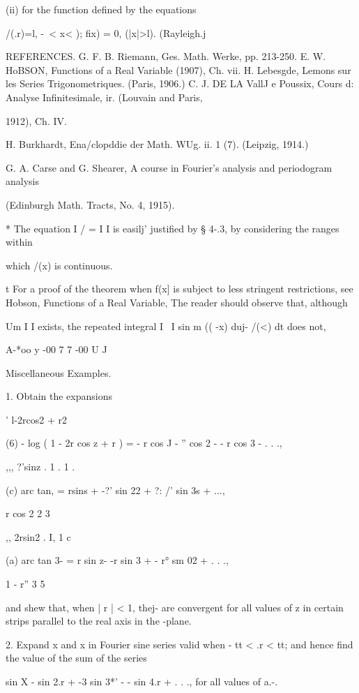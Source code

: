 {(ii) for the function defined by the equations

/(.r)=l, -\ < x< ); fix) = 0, (|x|>l). (Rayleigh.j

REFERENCES. G. F. B. Riemann, Ges. Math. Werke, pp. 213-250. E. W.
HoBSON, Functions of a Real Variable (1907), Ch. vii. H. Lebesgde,
Lemons sur les Series Trigonometriques. (Paris, 1906.) C. J. DE LA
VallJ e Poussix, Cours d: Analyse Infinitesimale, ir. (Louvain and
Paris,

1912), Ch. IV.

H. Burkhardt, Ena/clopddie der Math. WUg. ii. 1 (7). (Leipzig, 1914.)

G. A. Carse and G. Shearer, A course in Fourier's analysis and
periodogram analysis

(Edinburgh Math. Tracts, No. 4, 1915).

* The equation I / = I I is easilj' justified by § 4-.3, by
considering the ranges within

which /(x) is continuous.

t For a proof of the theorem when f(x] is subject to less stringent
restrictions, see Hobson, Functions of a Real Variable, %
The reader should observe that, although

Um I I exists, the repeated integral I \ I sin m (( -x) duj- /(<) dt
does not,

A-*oo y -00 7 7 -00 U J

%
%

Miscellaneous Examples.

1. Obtain the expansions

  ' l-2rcos2 + r2

(6) - log ( 1 - 2r cos z + r ) = - r cos J - '' cos 2 - - r cos 3 - .
. .,

,,, ?'sinz . 1 . 1 . \,

(c) arc tan, = rsins + -?' sin 22 + ?: /' sin 3s + ...,

   r cos 2 2 3

,, 2rsin2 . I,  1 c

(a) arc tan 3- = r sin z- -r sin 3 + - r° sm 02 + . . .,

1 - r'' 3 5

and shew that, when | r | < 1, thej- are convergent for all values of
z in certain strips parallel to the real axis in the -plane.

2. Expand x and x in Fourier sine series valid when - tt < .r < tt;
and hence find the value of the sum of the series

sin X - sin 2.r + -3 sin 3*' - - sin 4.r + . . ., for all values of
a.-. 

}
